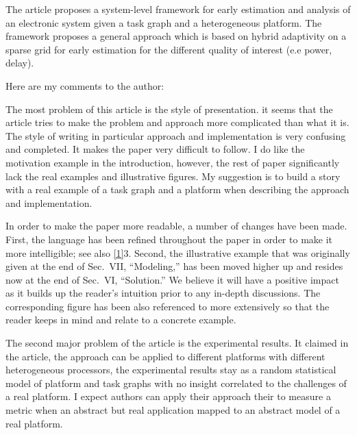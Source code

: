 \begin{reviewer}
The article proposes a system-level framework for early estimation and analysis
of an electronic system given a task graph and a heterogeneous platform. The
framework proposes a general approach which is based on hybrid adaptivity on a
sparse grid  for early estimation for the different quality of interest (e.e
power, delay).

Here are my comments to the author:

The most problem of this article is the style of presentation. it seems that the
article tries to make the problem and approach more complicated than what it is.
The style of writing in particular approach and implementation is very confusing
and completed. It makes the paper very difficult to follow. I do like the
motivation example in the introduction, however, the rest of paper significantly
lack the real examples and illustrative figures. My suggestion is to build a
story with a real example of a task graph and a platform when describing the
approach and implementation.
\end{reviewer}

\begin{authors}
In order to make the paper more readable, a number of changes have been made.
First, the language has been refined throughout the paper in order to make it
more intelligible; see also \cref{1}{3}. Second, the illustrative example that
was originally given at the end of Sec.~VII, ``Modeling,'' has been moved higher
up and resides now at the end of Sec.~VI, ``Solution.'' We believe it will have
a positive impact as it builds up the reader's intuition prior to any in-depth
discussions. The corresponding figure has been also referenced to more
extensively so that the reader keeps in mind and relate to a concrete example.

\begin{actions}
\end{actions}
\end{authors}

\begin{reviewer}
The second major problem of the article is the experimental results. It claimed
in the article, the approach can be applied to different platforms with
different heterogeneous processors, the experimental results stay as a random
statistical model of platform and task graphs with no insight correlated to the
challenges of a real platform. I expect authors can apply their approach their
to measure a metric when an abstract but real application mapped to an abstract
model of a real platform.
\end{reviewer}


